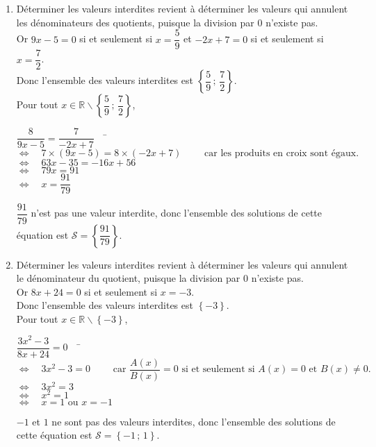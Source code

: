 \documentclass[a4paper,11pt,exos]{nsi} %
\begin{document}
\begin{enumerate}
    \item Déterminer les valeurs interdites revient à déterminer les valeurs qui annulent les dénominateurs des quotients, puisque la division par $0$ n'existe pas.\\Or $9x-5=0$ si et seulement si  $x=\dfrac{5}{9}$ et $-2x+7=0$ si et seulement si  $x=\dfrac{7}{2}$. \\
    Donc l'ensemble des valeurs interdites est  $\left\{\dfrac{5}{9}\,;\,\dfrac{7}{2}\right\}$. \\Pour tout $x\in \mathbb{R}\smallsetminus\left\{\dfrac{5}{9}\,;\,\dfrac{7}{2}\right\}$,\\
\begin{tabbing}
$\dfrac{8}{9x-5}=\dfrac{7}{-2x+7} \quad$ \= $\iff\quad 
7\times (9x-5)=8\times (-2x+7) \qquad\text{ car les produits en croix sont égaux.}$\\
\>  $\iff \quad63x-35=-16x+56$\\
\>  $\iff\quad79x= 91$\\
\>  $\iff\quad x=\dfrac{91}{79}$
\end{tabbing}
$\dfrac{91}{79}$ n'est pas une valeur interdite, donc l'ensemble des solutions de cette équation est  $\mathcal{S}=\left\{\dfrac{91}{79}\right\}$.



    \item Déterminer les valeurs interdites revient à déterminer les valeurs qui annulent le dénominateur du quotient, puisque la division par $0$ n'existe pas.\\Or $8x+24=0$ si et seulement si  $x=-3$. \\
    Donc l'ensemble des valeurs interdites est  $\left\{-3\right\}$.\\
    Pour tout $x\in \mathbb{R}\smallsetminus\left\{-3\right\}$, \\
      \begin{tabbing}
      $\dfrac{3x^2-3}{8x+24}=0\quad$    \= $ \iff\quad
      3x^2-3=0 \qquad \text{ car }\dfrac{A(x)}{B(x)}=0 \text { si et seulement si } A(x)=0 \text { et } B(x)\neq 0.$\\
        \>    $\iff\quad 3x^2=3$\\
        \>    $\iff\quad x^2=1$\\
        \>  $\iff\quad x= 1\text{ ou } x= -1$
     \end{tabbing}
       $-1$ et $1$ ne sont pas des valeurs interdites, donc l'ensemble des solutions de cette équation est  $\mathcal{S}=\left\{-1\,;\,1\right\}$.

  
\end{enumerate}
\end{document}
